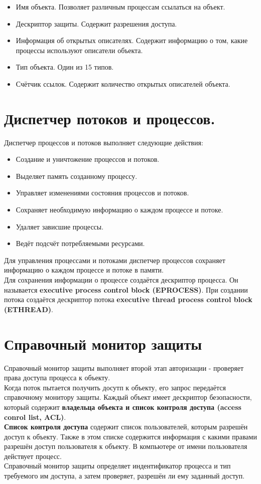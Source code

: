 \documentclass[a4paper]{article}
\begin{document}
\begin{itemize}
	\item Имя объекта. Позволяет различным процессам ссылаться на объект.
	\item Дескриптор защиты. Содержит разрешения доступа.
	\item Информация об открытых описателях. Содержит информацию о том, какие процессы используют описатели объекта.
	\item Тип объекта. Один из 15 типов.
	\item Счётчик ссылок. Содержит количество открытых описателей объекта.
\end{itemize}
\section{Диспетчер потоков и процессов.}
\setcounter{subsection}{0}
Диспетчер процессов и потоков выполняет следующие действия:
\begin{itemize}
	\item Создание и уничтожение процессов и потоков.
	\item Выделяет память созданному процессу.
	\item Управляет изменениями состояния процессов и потоков.
	\item Сохраняет необходимую информацию о каждом процессе и потоке.
	\item Удаляет зависшие процессы.
	\item Ведёт подсчёт потребляемыми ресурсами.
\end{itemize}
Для управления процессами и потоками диспетчер процессов сохраняет информацию о каждом процессе и потоке в памяти.\\
Для сохранения информации о процессе создаётся дескриптор процесса. Он называется \textbf{executive process control block (EPROCESS)}. При создании потока создаётся дескриптор потока \textbf{executive thread process control block (ETHREAD)}.
\section{Справочный монитор защиты}
\setcounter{subsection}{0}
Справочный монитор защиты выполняет второй этап авторизации - проверяет права доступа процесса к объекту.\\
Когда поток пытается получить досутп к объекту, его запрос передаётся справочному монитору защиты. Каждый объект имеет дескриптор безопасности, который содержит \textbf{владельца объекта и список контроля доступа (access conrol list, ACL)}.\\
\textbf{Список контроля доступа} содержит список пользователей, которым разрешён доступ к объекту. Также в этом списке содержится информация с какими правами разрешён доступ пользователя к объекту. В компьютере от имени пользователя действует процесс.\\
Справочный монитор защиты определяет индентификатор процесса и тип требуемого им доступа, а затем проверяет, разрешён ли ему заданный доступ.
\end{document}
